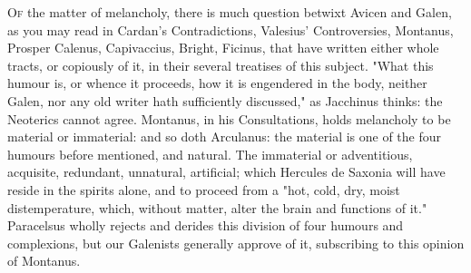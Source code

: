 \lettrine{O}{f} the matter of melancholy, there is much question betwixt Avicen
and Galen, as you may read in Cardan's Contradictions,
Valesius' Controversies, Montanus, Prosper Calenus,
Capivaccius, Bright, Ficinus, that
have written either whole tracts, or copiously of it, in their several
treatises of this subject. "What this humour is, or whence
it proceeds, how it is engendered in the body, neither Galen, nor any old
writer hath sufficiently discussed," as Jacchinus thinks: the Neoterics cannot
agree. Montanus, in his Consultations, holds melancholy to be material or
immaterial: and so doth Arculanus: the material is one of the four humours
before mentioned, and natural. The immaterial or adventitious, acquisite,
redundant, unnatural, artificial; which Hercules de
Saxonia will have reside in the spirits alone, and to proceed from a "hot,
cold, dry, moist distemperature, which, without matter, alter the brain and
functions of it." Paracelsus wholly rejects and derides this division of four
humours and complexions, but our Galenists generally approve of it, subscribing
to this opinion of Montanus.

